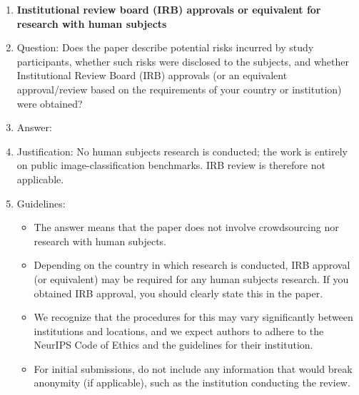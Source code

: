 \begin{enumerate}
\item {\bf Institutional review board (IRB) approvals or equivalent for research with human subjects}
    \item[] Question: Does the paper describe potential risks incurred by study participants, whether such risks were disclosed to the subjects, and whether Institutional Review Board (IRB) approvals (or an equivalent approval/review based on the requirements of your country or institution) were obtained?
    \item[] Answer: \answerNA{}
    \item[] Justification: No human subjects research is conducted; the work is entirely on public image-classification benchmarks. IRB review is therefore not applicable.
    \item[] Guidelines:
    \begin{itemize}
        \item The answer \answerNA{} means that the paper does not involve crowdsourcing nor research with human subjects.
        \item Depending on the country in which research is conducted, IRB approval (or equivalent) may be required for any human subjects research. If you obtained IRB approval, you should clearly state this in the paper. 
        \item We recognize that the procedures for this may vary significantly between institutions and locations, and we expect authors to adhere to the NeurIPS Code of Ethics and the guidelines for their institution. 
        \item For initial submissions, do not include any information that would break anonymity (if applicable), such as the institution conducting the review.
    \end{itemize}


\end{enumerate}
